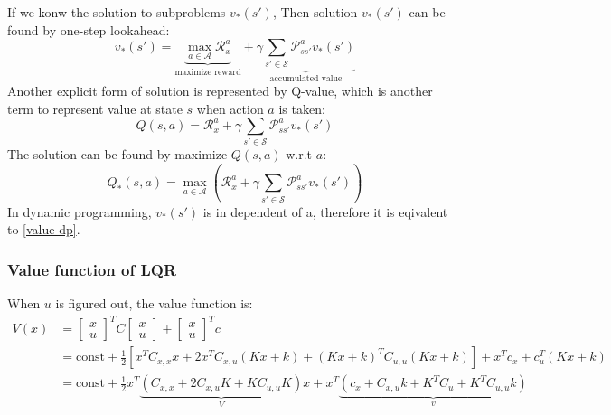 \documentclass{article}
\begin{document}
If we konw the solution to subproblems $v_*(s')$, Then solution $v_*(s')$ can be found by one-step lookahead:
\begin{equation}
    v_*(s') = \underbrace{\max_{a \in \mathcal{A}} \mathcal{R}_x^a}_{\text{maximize reward}} + \underbrace{\gamma \sum\limits_{s' \in \mathcal{S}} \mathcal{P}_{ss'}^a v_*(s')}_{\text{accumulated value}} \label{value-dp}
\end{equation}
Another explicit form of solution is represented by Q-value, which is another term to represent value at state $s$ when action $a$ is taken:
\begin{equation}
    Q(s, a) = \mathcal{R}_x^a + \gamma \sum\limits_{s' \in \mathcal{S}} \mathcal{P}_{ss'}^a v_*(s') \label{q_value-dp}
\end{equation}
The solution can be found by maximize $Q(s, a)$ w.r.t $a$:
\begin{equation}
    Q_*(s, a) = \max_{a \in \mathcal{A}}{(\mathcal{R}_x^a + \gamma \sum\limits_{s' \in \mathcal{S}}\mathcal{P}_{ss'}^a v_*(s'))} \label{q_value-dp}
\end{equation}
In dynamic programming, $v_*(s')$ is in dependent of a, therefore it is eqivalent to \eqref{value-dp}.

\subsubsection{Value function of LQR}
When $u$ is figured out, the value function is:
\begin{align}
V(x) &= \begin{bmatrix}
        x\\u
    \end{bmatrix}^T C \begin{bmatrix}
        x\\u
    \end{bmatrix}
    + \begin{bmatrix}
        x\\u
    \end{bmatrix}^T c\\
    &=\text{const} + \frac{1}{2}[x^TC_{x, x}x + 2x^TC_{x, u}(Kx + k) + (Kx+k)^TC_{u, u}(Kx+k)] + x^Tc_x + c_u^T(Kx + k)\\
    &=\text{const} + \frac{1}{2}x^T\underbrace{(C_{x, x} + 2C_{x, u}K + KC_{u, u}K)}_{V}x+x^T\underbrace{(c_x + C_{x, u}k + K^TC_u + K^TC_{u, u}k)}_{v} \label{value-function-coeff}
\end{align}
\end{document}
